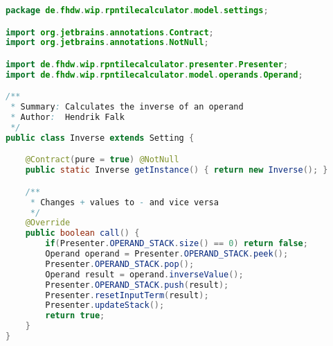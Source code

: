 \begin{lstlisting}[caption=Inverse (Falk),label=list:Inverse,language=Java]
package de.fhdw.wip.rpntilecalculator.model.settings;

import org.jetbrains.annotations.Contract;
import org.jetbrains.annotations.NotNull;

import de.fhdw.wip.rpntilecalculator.presenter.Presenter;
import de.fhdw.wip.rpntilecalculator.model.operands.Operand;

/**
 * Summary: Calculates the inverse of an operand
 * Author:  Hendrik Falk
 */
public class Inverse extends Setting {

    @Contract(pure = true) @NotNull
    public static Inverse getInstance() { return new Inverse(); }

    /**
     * Changes + values to - and vice versa
     */
    @Override
    public boolean call() {
        if(Presenter.OPERAND_STACK.size() == 0) return false;
        Operand operand = Presenter.OPERAND_STACK.peek();
        Presenter.OPERAND_STACK.pop();
        Operand result = operand.inverseValue();
        Presenter.OPERAND_STACK.push(result);
        Presenter.resetInputTerm(result);
        Presenter.updateStack();
        return true;
    }
}
\end{lstlisting}    

